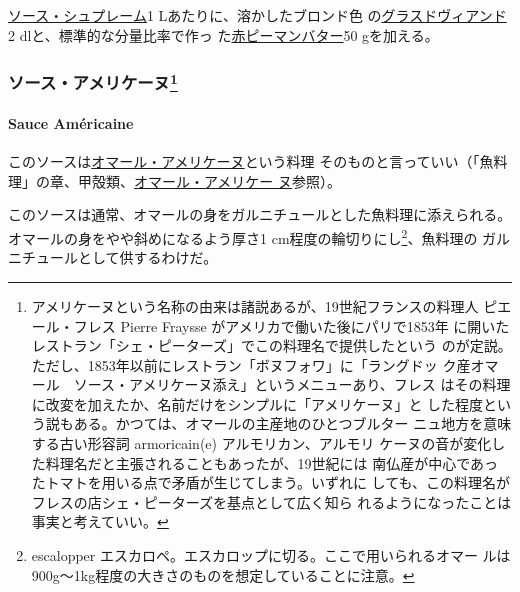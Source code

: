 \begin{recette}

\protect\hyperlink{sauce-supreme}{ソース・シュプレーム}1
Lあたりに、溶かしたブロンド色
の\protect\hyperlink{glace-de-viande}{グラスドヴィアンド}2
dlと、標準的な分量比率で作っ た\href{}{赤ピーマンバター}50 gを加える。

\maeaki

\hypertarget{ux30bdux30fcux30b9ux30a2ux30e1ux30eaux30b1ux30fcux30cc3}{%
\subsubsection[ソース・アメリケーヌ]{\texorpdfstring{ソース・アメリケーヌ\footnote{アメリケーヌという名称の由来は諸説あるが、19世紀フランスの料理人
  ピエール・フレス Pierre Fraysse がアメリカで働いた後にパリで1853年
  に開いたレストラン「シェ・ピーターズ」でこの料理名で提供したという
  のが定説。ただし、1853年以前にレストラン「ボヌフォワ」に「ラングドッ
  ク産オマール　ソース・アメリケーヌ添え」というメニューあり、フレス
  はその料理に改変を加えたか、名前だけをシンプルに「アメリケーヌ」と
  した程度という説もある。かつては、オマールの主産地のひとつブルター
  ニュ地方を意味する古い形容詞 armoricain(e) アルモリカン、アルモリ
  ケーヌの音が変化した料理名だと主張されることもあったが、19世紀には
  南仏産が中心であったトマトを用いる点で矛盾が生じてしまう。いずれに
  しても、この料理名がフレスの店シェ・ピーターズを基点として広く知ら
  れるようになったことは事実と考えていい。}}{ソース・アメリケーヌ}}\label{ux30bdux30fcux30b9ux30a2ux30e1ux30eaux30b1ux30fcux30cc3}}

\hypertarget{sauce-americaine}{%
\paragraph{Sauce Américaine}\label{sauce-americaine}}


このソースは\protect\hyperlink{homard-a-l-americaine}{オマール・アメリケーヌ}という料理
そのものと言っていい（「魚料理」の章、甲殻類、\protect\hyperlink{homard-a-l-americaine}{オマール・アメリケー
ヌ}参照）。

このソースは通常、オマールの身をガルニチュールとした魚料理に添えられる。
オマールの身をやや斜めになるよう厚さ1 cm程度の輪切りにし\footnote{escalopper
  エスカロペ。エスカロップに切る。ここで用いられるオマー
  ルは900g〜1kg程度の大きさのものを想定していることに注意。}、魚料理の
ガルニチュールとして供するわけだ。


\end{recette}
